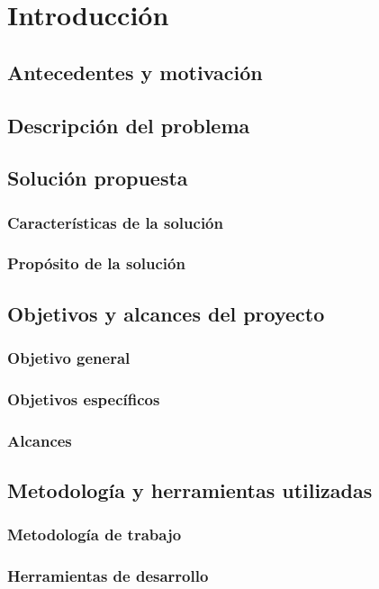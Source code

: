 \chapter{Introducción}
\section{Antecedentes y motivación}

\section{Descripción del problema}

\section{Solución propuesta}
\subsection{Características de la solución}
\subsection{Propósito de la solución}

\section{Objetivos y alcances del proyecto}
\subsection{Objetivo general}
\subsection{Objetivos específicos}
\subsection{Alcances}

\section{Metodología y herramientas utilizadas}
\subsection{Metodología de trabajo}
\subsection{Herramientas de desarrollo}
